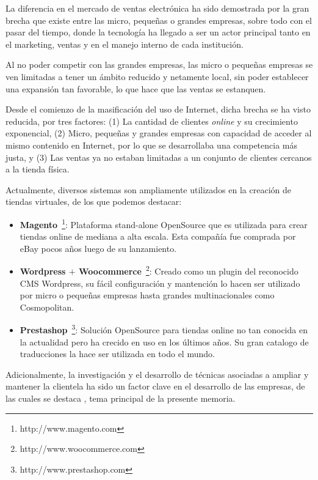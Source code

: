 La diferencia en el mercado de ventas electrónica ha sido demostrada por la gran
brecha que existe entre las micro, pequeñas o grandes empresas, sobre todo con el
pasar del tiempo, donde la tecnología ha llegado a ser un actor principal
tanto en el marketing, ventas y en el manejo interno de cada institución.

Al no poder competir con las grandes empresas, las micro o pequeñas empresas se ven
limitadas a tener un ámbito reducido y netamente local, sin poder establecer
una expansión tan favorable, lo que hace que las ventas se estanquen.

Desde el comienzo de la masificación del uso de Internet, dicha brecha se ha
visto reducida, por tres factores: (1) La cantidad de clientes \emph{online}
y su crecimiento exponencial, (2) Micro, pequeñas y grandes empresas con capacidad
de acceder al mismo contenido en Internet, por lo que se desarrollaba una competencia
más justa, y (3) Las ventas ya no estaban limitadas a un conjunto de clientes
cercanos a la tienda física.

Actualmente, diversos sistemas son ampliamente utilizados en la creación
de tiendas virtuales, de los que podemos destacar:

\begin{itemize}
    \item {\bf Magento}~\footnote{http://www.magento.com}:
        Plataforma stand-alone OpenSource que es utilizada para crear tiendas online
        de mediana a alta escala.
        Esta compañía fue comprada por eBay pocos años luego de su lanzamiento.

    \item {\bf Wordpress $+$ Woocommerce}~\footnote{http://www.woocommerce.com}:
        Creado como un plugin del reconocido CMS Wordpress, su fácil configuración
        y mantención lo hacen ser utilizado por micro o pequeñas empresas hasta
        grandes multinacionales como Cosmopolitan.

    \item {\bf Prestashop}~\footnote{http://www.prestashop.com}:
        Solución OpenSource para tiendas online no tan conocida en la actualidad
        pero ha crecido en uso en los últimos años.
        Su gran catalogo de traducciones la hace ser utilizada en todo el mundo.

\end{itemize}

Adicionalmente, la investigación y el desarrollo de técnicas asociadas a ampliar
y mantener la clientela ha sido un factor clave en el desarrollo de las empresas,
de las cuales se destaca {\GAM}, tema principal de la presente memoria.

